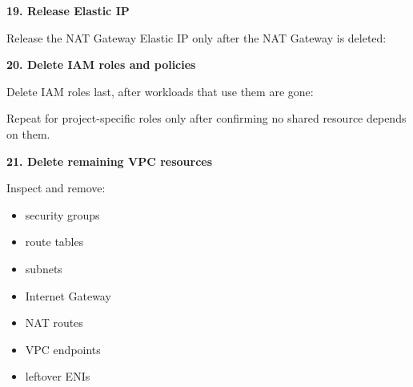 \vspace{0.5em}\noindent\textbf{19. Release Elastic IP}\par

Release the NAT Gateway Elastic IP only after the NAT Gateway is
deleted:

\begin{Shaded}
\begin{Highlighting}[]
 \OperatorTok{\textless{}}\OperatorTok{\textgreater{}}
\end{Highlighting}
\end{Shaded}

\vspace{0.5em}\noindent\textbf{20. Delete IAM roles and
policies}\par

Delete IAM roles last, after workloads that use them are gone:

\begin{Shaded}
\begin{Highlighting}[]
 \OperatorTok{\textless{}}\OperatorTok{\textgreater{}}
\end{Highlighting}
\end{Shaded}

Repeat for project-specific roles only after confirming no shared
resource depends on them.

\vspace{0.5em}\noindent\textbf{21. Delete remaining VPC
resources}\par

Inspect and remove:

\begin{itemize}
\tightlist
\item
  security groups
\item
  route tables
\item
  subnets
\item
  Internet Gateway
\item
  NAT routes
\item
  VPC endpoints
\item
  leftover ENIs
\end{itemize}

